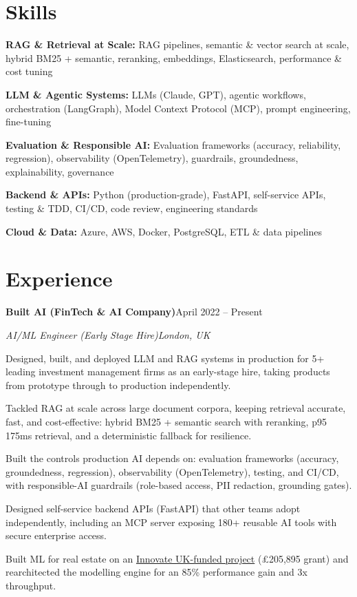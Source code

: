 \documentclass[10pt,a4paper]{article}
\newcommand{\entry}[4]{%
  {\color{company}\bfseries #1}\hfill {\color{muted}#2}\par
  \vspace{1pt}
  {\itshape #3}\hfill {\color{muted}\itshape #4}\par
  \vspace{3pt}%
}
\begin{document}
\section{Skills}
\begin{tight}
  \item[\textcolor{accent}{\small$\bullet$}] \textbf{RAG \& Retrieval at Scale:} RAG pipelines, semantic \& vector search at scale, hybrid BM25 + semantic, reranking, embeddings, Elasticsearch, performance \& cost tuning
  \item[\textcolor{accent}{\small$\bullet$}] \textbf{LLM \& Agentic Systems:} LLMs (Claude, GPT), agentic workflows, orchestration (LangGraph), Model Context Protocol (MCP), prompt engineering, fine-tuning
  \item[\textcolor{accent}{\small$\bullet$}] \textbf{Evaluation \& Responsible AI:} Evaluation frameworks (accuracy, reliability, regression), observability (OpenTelemetry), guardrails, groundedness, explainability, governance
  \item[\textcolor{accent}{\small$\bullet$}] \textbf{Backend \& APIs:} Python (production-grade), FastAPI, self-service APIs, testing \& TDD, CI/CD, code review, engineering standards
  \item[\textcolor{accent}{\small$\bullet$}] \textbf{Cloud \& Data:} Azure, AWS, Docker, PostgreSQL, ETL \& data pipelines
\end{tight}

\section{Experience}
\entry{Built AI (FinTech \& AI Company)}{April 2022 -- Present}{AI/ML Engineer (Early Stage Hire)}{London, UK}
\begin{tight}
  \item Designed, built, and deployed LLM and RAG systems in production for 5+ leading investment management firms as an early-stage hire, taking products from prototype through to production independently.
  \item Tackled RAG at scale across large document corpora, keeping retrieval accurate, fast, and cost-effective: hybrid BM25 + semantic search with reranking, p95 175ms retrieval, and a deterministic fallback for resilience.
  \item Built the controls production AI depends on: evaluation frameworks (accuracy, groundedness, regression), observability (OpenTelemetry), testing, and CI/CD, with responsible-AI guardrails (role-based access, PII redaction, grounding gates).
  \item Designed self-service backend APIs (FastAPI) that other teams adopt independently, including an MCP server exposing 180+ reusable AI tools with secure enterprise access.
  \item Built ML for real estate on an \href{https://gtr.ukri.org/projects?ref=10022996}{Innovate UK-funded project} (\pounds205,895 grant) and rearchitected the modelling engine for an 85\% performance gain and 3x throughput.
\end{tight}
\end{document}
